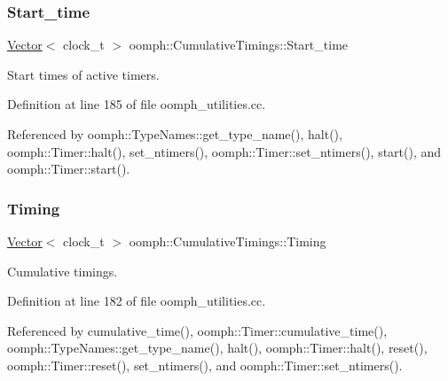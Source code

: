 \subsubsection{\texorpdfstring{Start\+\_\+time}{Start\_time}}
{\footnotesize\ttfamily \hyperlink{classoomph_1_1Vector}{Vector}$<$ clock\+\_\+t $>$ oomph\+::\+Cumulative\+Timings\+::\+Start\+\_\+time}



Start times of active timers. 



Definition at line 185 of file oomph\+\_\+utilities.\+cc.



Referenced by oomph\+::\+Type\+Names\+::get\+\_\+type\+\_\+name(), halt(), oomph\+::\+Timer\+::halt(), set\+\_\+ntimers(), oomph\+::\+Timer\+::set\+\_\+ntimers(), start(), and oomph\+::\+Timer\+::start().

\mbox{\label{namespaceoomph_1_1CumulativeTimings_aaa3cc3208ed1f841dd3ff0ddf346a067}} 
\subsubsection{\texorpdfstring{Timing}{Timing}}
{\footnotesize\ttfamily \hyperlink{classoomph_1_1Vector}{Vector}$<$ clock\+\_\+t $>$ oomph\+::\+Cumulative\+Timings\+::\+Timing}



Cumulative timings. 



Definition at line 182 of file oomph\+\_\+utilities.\+cc.



Referenced by cumulative\+\_\+time(), oomph\+::\+Timer\+::cumulative\+\_\+time(), oomph\+::\+Type\+Names\+::get\+\_\+type\+\_\+name(), halt(), oomph\+::\+Timer\+::halt(), reset(), oomph\+::\+Timer\+::reset(), set\+\_\+ntimers(), and oomph\+::\+Timer\+::set\+\_\+ntimers().

